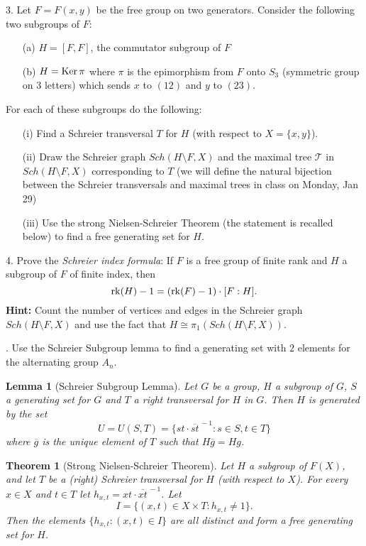 \documentclass[12pt]{amsart}
\newtheorem* {Theorem}    {Theorem}
\newtheorem* {Lemma}    {Lemma}
\begin{document}
3. Let $F=F(x,y)$ be the free group on two generators. Consider the following two subgroups of $F$:
\begin{itemize}
\item[(a)] $H=[F,F]$, the commutator subgroup of $F$
\item[(b)] $H={\rm Ker}\,\pi$ where $\pi$ is the epimorphism from $F$ onto $S_3$ (symmetric group on $3$ letters)
which sends $x$ to $(12)$ and $y$ to $(23)$.
\end{itemize}
For each of these subgroups do the following:
\begin{itemize}
\item[(i)] Find a Schreier transversal $T$ for $H$ (with respect to $X=\{x,y\}$).
\item[(ii)] Draw the Schreier graph $Sch(H\setminus F,X)$ and the maximal tree $\mathcal T$ in $Sch(H\setminus F,X)$ corresponding to $T$
(we will define the natural bijection between the Schreier transversals and maximal trees in class on Monday, Jan 29)
\item[(iii)] Use the strong Nielsen-Schreier Theorem (the statement is recalled below) to find a free generating set for $H$.
\end{itemize}
\skv

4. Prove the {\it Schreier index formula}: If $F$ is a free group of finite rank and $H$ a subgroup of $F$ of finite index,
then $${\rm rk}(H)-1=({\rm rk}(F)-1)\cdot [F:H].$$ 
{\bf Hint:} Count the number of vertices and edges in the Schreier graph $Sch(H\setminus F,X)$
and use the fact that $H\cong \pi_1(Sch(H\setminus F,X))$. 
 
. Use the Schreier Subgroup lemma to find a generating set with $2$ elements for the alternating group $A_n$.
\skv
\begin{Lemma}[Schreier Subgroup Lemma] Let $G$ be a group, $H$ a subgroup of $G$, $S$ a generating set for $G$ and $T$ a right transversal for $H$ in $G$.
Then $H$ is generated by the set
$$U=U(S,T)=\{st\cdot{\overline{st}}^{\,-1}: s\in S, t\in T\}$$
where $\overline g$ is the unique element of $T$ such that $H\overline g=Hg$.
\end{Lemma}

\begin{Theorem}[Strong Nielsen-Schreier Theorem] Let $H$ a subgroup of $F(X)$, and let $T$ be a (right) Schreier transversal for $H$ (with respect to $X$). For every $x\in X$ and $t\in T$ let $h_{x,t}=xt\cdot {\overline{xt}}^{\,-1}$.
Let $$I=\{(x,t)\in X\times T: h_{x,t}\neq 1\}.$$ Then the elements $\{h_{x,t}: (x,t)\in I\}$ are all distinct and form a free 
generating set for $H$.
\end{Theorem}
\end{document}
